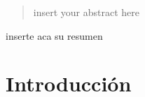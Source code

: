 \documentclass[thesis,final]{udpbook}
\begin{document}
%
%
\begin{abstract}                        %
insert your abstract here
\end{abstract}                          %
%
%
\begin{resumen}                         %
inserte aca su resumen
\end{resumen}                           %
%
%
\cleardoublepage                        %
\mainmatter                             %
%
\chapter{Introducción}

%
%
%
%
%
%
\appendix
%
%
%
%
%
\backmatter
\end{document}
